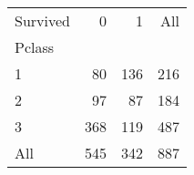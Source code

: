 \begin{tabular}{lrrr}
\toprule
Survived &    0 &    1 &  All \\
Pclass &      &      &      \\
\midrule
1      &   80 &  136 &  216 \\
2      &   97 &   87 &  184 \\
3      &  368 &  119 &  487 \\
All    &  545 &  342 &  887 \\
\bottomrule
\end{tabular}
